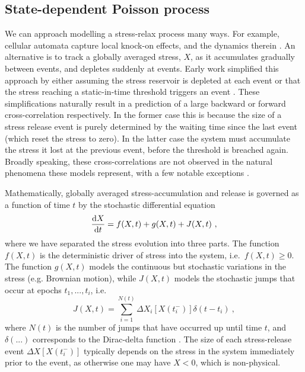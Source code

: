 \subsection{State-dependent Poisson process} \label{sec:intro_sdp} 
We can approach modelling a stress-relax process many ways. For example, cellular automata capture local knock-on effects, and the dynamics therein \citep{Bak1988,Warszawski2008,Kerin2022}. An alternative is to track a globally averaged stress, $X$, as it accumulates gradually between events, and depletes suddenly at events. Early work simplified this approach by either assuming the stress reservoir is depleted at each event \citep{Rosner1978,Daly2006} or that the stress reaching a static-in-time threshold triggers an event \citep{Gaizauskas1987,Daly2007,Hudson2019}. These simplifications naturally result in a prediction of a large backward or forward cross-correlation respectively. In the former case this is because the size of a stress release event is purely determined by the waiting time since the last event (which reset the stress to zero). In the latter case the system must accumulate the stress it lost at the previous event, before the threshold is breached again. Broadly speaking, these cross-correlations are not observed in the natural phenomena these models represent, with a few notable exceptions \citep{Lewin1976,Middleditch2006}.

Mathematically, globally averaged stress-accumulation and release is governed as a function of time $t$ by the stochastic differential equation
\begin{equation}
    \frac{\textrm{d} X}{\textrm{d} t} = f(X, t) + g(X, t) + J(X, t)\ , \label{eq:gen_jumpsde}
\end{equation}
where we have separated the stress evolution into three parts. The function $f(X, t)$ is the deterministic driver of stress into the system, i.e.~$f(X, t) \geq 0$. The function $g(X, t)$ models the continuous but stochastic variations in the stress (e.g. Brownian motion), while $J(X, t)$ models the stochastic jumps that occur at epochs $t_1, ..., t_i$, i.e.
\begin{equation}
    J(X, t) = \sum_{i=1}^{N(t)} \Delta X_i[X(t_i^-)] \delta(t - t_i)\ ,
\end{equation}
where $N(t)$ is the number of jumps that have occurred up until time $t$, and $\delta(...)$ corresponds to the Dirac-delta function \citep{Daly2006,Daly2007,Wheatland2009}. The size of each stress-release event $\Delta X[X(t_i^-)]$ typically depends on the stress in the system immediately prior to the event, as otherwise one may have $X < 0$, which is non-physical. 

